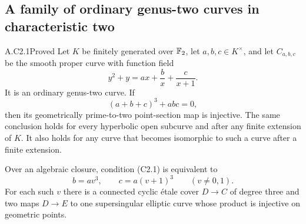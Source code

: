\subsection{A family of ordinary genus-two curves in characteristic two}

\begin{claim}{A.C2.1}{Proved}
Let $K$ be finitely generated over $\mathbb F_2$, let $a,b,c\in K^\times$,
and let $C_{a,b,c}$ be the smooth proper curve with function field
\[
 y^2+y=a x+\frac b{x}+\frac c{x+1}.
\]
It is an ordinary genus-two curve. If
\[
                    (a+b+c)^3+abc=0,                         \tag{C2.1}
\]
then its geometrically prime-to-two point-section map is injective.
The same conclusion holds for every hyperbolic open subcurve and after
any finite extension of $K$. It also holds for any curve that becomes
isomorphic to such a curve after a finite extension.

Over an algebraic closure, condition (C2.1) is equivalent to
\[
 b=a v^3,\qquad c=a(v+1)^3\qquad(v\ne0,1).                    \tag{C2.2}
\]
For each such $v$ there is a connected cyclic \'etale cover $D\to C$
of degree three and two maps $D\to E$ to one supersingular elliptic
curve whose product is injective on geometric points.
\end{claim}
